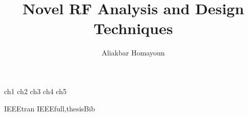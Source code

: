 \documentclass [PhD] {uclathes}
\title          {Novel RF Analysis and Design Techniques}
\author         {Aliakbar Homayoun}
\begin{document}
\makeintropages

%
%
 {ch1}                         %
 {ch2}                         %
 {ch3}                         %
 {ch4}
 {ch5}



 {IEEEtran}
 {IEEEfull,thesisBib} 
\end{document}
